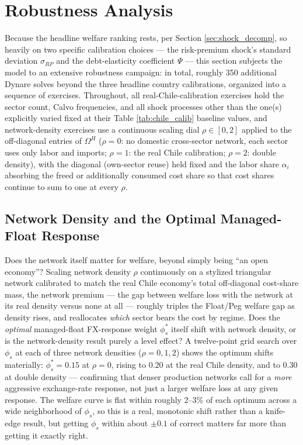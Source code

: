 \documentclass[12pt]{article}
\begin{document}
\section{Robustness Analysis}
\label{sec:robustness}

Because the headline welfare ranking rests, per Section \ref{sec:shock_decomp}, so heavily on two
specific calibration choices --- the risk-premium shock's standard deviation $\sigma_{RP}$ and the
debt-elasticity coefficient $\Psi$ --- this section subjects the model to an extensive robustness
campaign: in total, roughly 350 additional Dynare solves beyond the three headline country
calibrations, organized into a sequence of exercises. Throughout, all real-Chile-calibration exercises
hold the sector count, Calvo frequencies, and all shock processes other than the one(s) explicitly
varied fixed at their Table \ref{tab:chile_calib} baseline values, and network-density exercises use a
continuous scaling dial $\rho\in[0,2]$ applied to the off-diagonal entries of $\Omega^H$ ($\rho=0$: no
domestic cross-sector network, each sector uses only labor and imports; $\rho=1$: the real Chile
calibration; $\rho=2$: double density), with the diagonal (own-sector reuse) held fixed and the labor
share $\alpha_i$ absorbing the freed or additionally consumed cost share so that cost shares continue
to sum to one at every $\rho$.

\subsection{Network Density and the Optimal Managed-Float Response}

Does the network itself matter for welfare, beyond simply being ``an open economy''? Scaling network
density $\rho$ continuously on a stylized triangular network calibrated to match the real Chile
economy's total off-diagonal cost-share mass, the network premium --- the gap between welfare loss
with the network at its real density versus none at all --- roughly triples the Float/Peg welfare gap
as density rises, and reallocates \emph{which} sector bears the cost by regime. Does the
\emph{optimal} managed-float FX-response weight $\phi_s^*$ itself shift with network density, or is
the network-density result purely a level effect? A twelve-point grid search over $\phi_s$ at each of
three network densities ($\rho=0,1,2$) shows the optimum shifts materially: $\phi_s^*=0.15$ at
$\rho=0$, rising to $0.20$ at the real Chile density, and to $0.30$ at double density --- confirming
that denser production networks call for a \emph{more} aggressive exchange-rate response, not just a
larger welfare loss at any given response. The welfare curve is flat within roughly 2--3\% of each
optimum across a wide neighborhood of $\phi_s$, so this is a real, monotonic shift rather than a
knife-edge result, but getting $\phi_s$ within about $\pm0.1$ of correct matters far more than getting
it exactly right.
\end{document}
